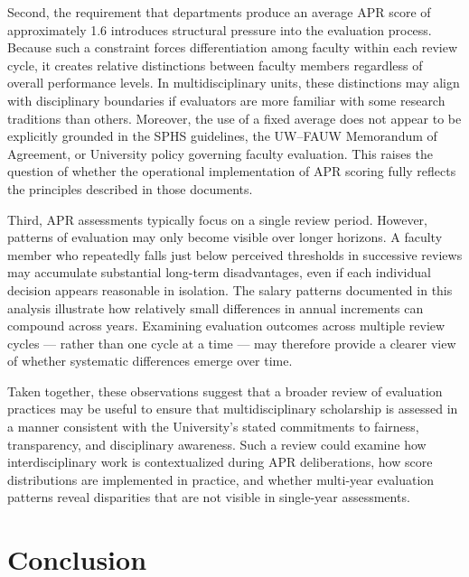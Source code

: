\documentclass{article}
\begin{document}
Second, the requirement that departments produce an average APR score of approximately 1.6 introduces structural pressure into the evaluation process. Because such a constraint forces differentiation among faculty within each review cycle, it creates relative distinctions between faculty members regardless of overall performance levels. In multidisciplinary units, these distinctions may align with disciplinary boundaries if evaluators are more familiar with some research traditions than others. Moreover, the use of a fixed average does not appear to be explicitly grounded in the SPHS guidelines, the UW--FAUW Memorandum of Agreement, or University policy governing faculty evaluation. This raises the question of whether the operational implementation of APR scoring fully reflects the principles described in those documents.

Third, APR assessments typically focus on a single review period. However, patterns of evaluation may only become visible over longer horizons. A faculty member who repeatedly falls just below perceived thresholds in successive reviews may accumulate substantial long-term disadvantages, even if each individual decision appears reasonable in isolation. The salary patterns documented in this analysis illustrate how relatively small differences in annual increments can compound across years. Examining evaluation outcomes across multiple review cycles --- rather than one cycle at a time --- may therefore provide a clearer view of whether systematic differences emerge over time.

Taken together, these observations suggest that a broader review of evaluation practices may be useful to ensure that multidisciplinary scholarship is assessed in a manner consistent with the University's stated commitments to fairness, transparency, and disciplinary awareness. Such a review could examine how interdisciplinary work is contextualized during APR deliberations, how score distributions are implemented in practice, and whether multi-year evaluation patterns reveal disparities that are not visible in single-year assessments.



\section*{Conclusion}
\end{document}
